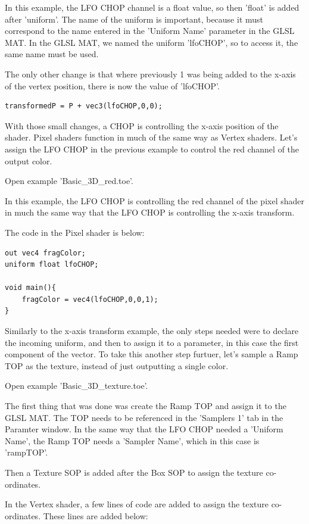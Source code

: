 \begin{fullwidth}
In this example, the LFO CHOP channel is a float value, so then 'float' is added after 'uniform'. The name of the uniform is important, because it must correspond to the name entered in the 'Uniform Name' parameter in the GLSL MAT. In the GLSL MAT, we named the uniform 'lfoCHOP', so to access it, the same name must be used.

The only other change is that where previously 1 was being added to the x-axis of the vertex position, there is now the value of 'lfoCHOP'.

\begin{lstlisting}
transformedP = P + vec3(lfoCHOP,0,0);
\end{lstlisting}

With those small changes, a CHOP is controlling the x-axis position of the shader. Pixel shaders function in much of the same way as Vertex shaders. Let's assign the LFO CHOP in the previous example to control the red channel of the output color.

Open example 'Basic\_3D\_red.toe'.

In this example, the LFO CHOP is controlling the red channel of the pixel shader in much the same way that the LFO CHOP is controlling the x-axis transform.

The code in the Pixel shader is below:

\begin{lstlisting}
out vec4 fragColor;
uniform float lfoCHOP;

void main(){
	fragColor = vec4(lfoCHOP,0,0,1);
}
\end{lstlisting}

Similarly to the x-axis transform example, the only steps needed were to declare the incoming uniform, and then to assign it to a parameter, in this case the first component of the vector. To take this another step furtuer, let's sample a Ramp TOP as the texture, instead of just outputting a single color.

Open example 'Basic\_3D\_texture.toe'.

The first thing that was done was create the Ramp TOP and assign it to the GLSL MAT. The TOP needs to be referenced in the 'Samplers 1' tab in the Paramter window. In the same way that the LFO CHOP needed a 'Uniform Name', the Ramp TOP needs a 'Sampler Name', which in this case is 'rampTOP'.

Then a Texture SOP is added after the Box SOP to assign the texture co-ordinates.

In the Vertex shader, a few lines of code are added to assign the texture co-ordinates. These lines are added below:



\end{fullwidth}
